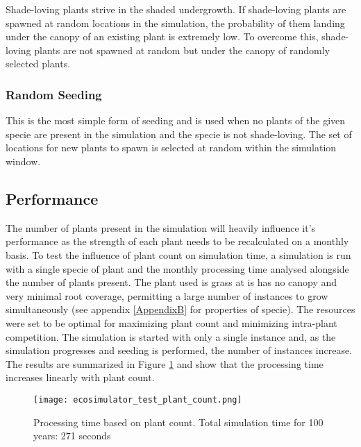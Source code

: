 Shade-loving plants strive in the shaded undergrowth. If shade-loving plants are spawned at random locations in the simulation, the probability of them landing under the canopy of an existing plant is extremely low. To overcome this, shade-loving plants are not spawned at random but under the canopy of randomly selected plants.

\subsubsection{Random Seeding}

This is the most simple form of seeding and is used when no plants of the given specie are present in the simulation and the specie is not shade-loving. The set of locations for new plants to spawn is selected at random within the simulation window.

\subsection{Performance} \label{subsec:ecosytem_performance}

The number of plants present in the simulation will heavily influence it's performance as the strength of each plant needs to be recalculated on a monthly basis. To test the influence of plant count on simulation time, a simulation is run with a single specie of plant and the monthly processing time analysed alongside the number of plants present. The plant used is grass at is has no canopy and very minimal root coverage, permitting a large number of instances to grow simultaneously (see appendix \ref{AppendixB} for properties of specie). The resources were set to be optimal for maximizing plant count and minimizing intra-plant competition. The simulation is started with only a single instance and, as the simulation progresses and seeding is performed, the number of instances increase. The results are summarized in Figure \ref{fig:ecosimulator_test_plant_count} and show that the processing time increases linearly with plant count. \\

\begin{figure}
\center
	\texttt{[image: ecosimulator\_test\_plant\_count.png]}
	\caption{ Processing time based on plant count. Total simulation time for 100 years: 271 seconds}	
	\label{fig:ecosimulator_test_plant_count}
\end{figure}

